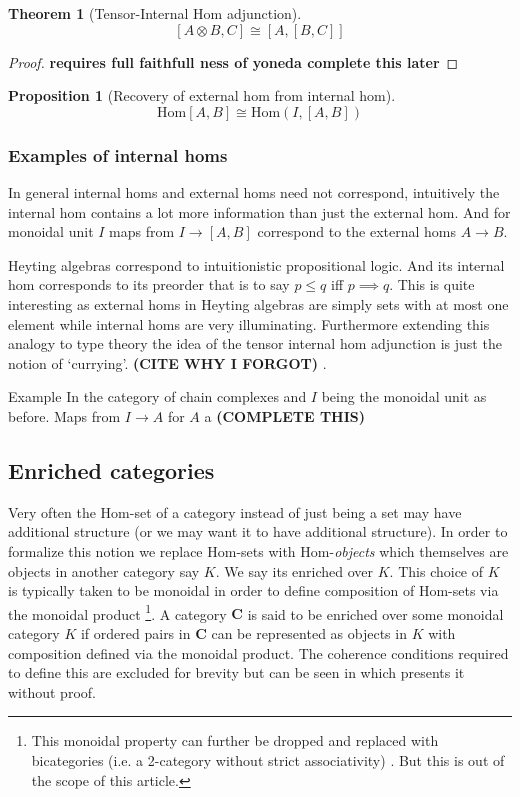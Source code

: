 \documentclass[12pt]{article}
\numberwithin{equation}{section}
\newcommand{\Hom}{{\mathrm{Hom}}}
\newtheorem{theorem}{Theorem}[section]
\newtheorem{proposition}{Proposition}[section]
\begin{document}
	
	\begin{theorem}[Tensor-Internal Hom adjunction]
		\[ [A\otimes B, C] \cong [A, [B,C]] \]
	\end{theorem}
	\begin{proof}
	\textbf{	requires full faithfull ness of yoneda complete this later}
	\end{proof}
	
	\begin{proposition}[Recovery of external hom from internal hom]
		\[ \Hom[A,B]\cong \Hom(I,[A,B]) \]
	\end{proposition}
	
	\subsubsection{Examples of internal homs}
	In general internal homs and external homs need not correspond, intuitively the internal hom contains a lot more information than just the external hom. And for monoidal unit $I$ maps from $I \to [A,B]$ correspond to the external homs $A \to B$.
	
	Heyting algebras correspond to intuitionistic propositional logic. And its internal hom corresponds to its preorder that is to say $p \leq q $ iff $  p \implies q$. This is quite interesting as external homs in Heyting algebras are simply sets with at most one element while internal homs are very illuminating. Furthermore extending this analogy to type theory the idea of the tensor internal hom adjunction is just the notion of `currying'. \textbf{(CITE WHY I FORGOT)}	.
	
	Example In the category of chain complexes and $I$ being the monoidal unit as before. Maps from $I \to A$ for $A$ a \textbf{(COMPLETE THIS)}
	
	\subsection{Enriched categories}
	Very often the Hom-set of a category instead of just being a set may have additional structure (or we may want it to have additional structure). In order to formalize this notion we replace Hom-sets with Hom-\textit{objects} which themselves are objects in another category say $K$. We say its enriched over $K$. This choice of $K$ is typically taken to be monoidal in order to define composition of Hom-sets via the monoidal product \footnote{This monoidal property can further be dropped and replaced with bicategories (i.e. a 2-category without strict associativity) \cite{garner2015enriched}. But this is out of the scope of this article.}. A category $\mathbf{C}$ is said to be enriched over some monoidal category $K$ if ordered pairs in $\mathbf{C}$ can be represented as objects in $K$ with composition defined via the monoidal product. The coherence conditions required to define this are excluded for brevity but can be seen in \cite[Chp. ~3]{riehl_2014} which presents it without proof.
	
\end{document}
